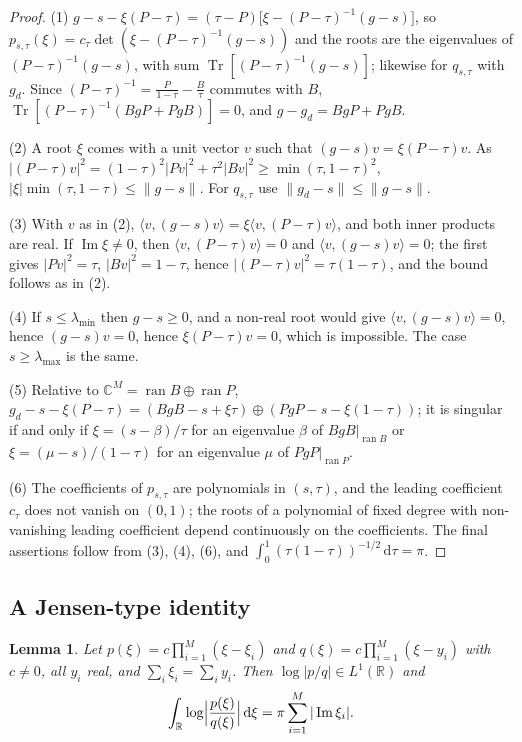 \documentclass[11pt]{amsart}
\newtheorem{lemma}[theorem]{Lemma}
\theoremstyle{definition}
\theoremstyle{remark}
\numberwithin{equation}{section}
\newcommand{\R}{\mathbb{R}}
\newcommand{\C}{\mathbb{C}}
\newcommand{\Tr}{\operatorname{Tr}}
\renewcommand{\Im}{\operatorname{Im}}
\newcommand{\ip}[2]{\langle #1,#2\rangle}
\newcommand{\lmin}{\lambda_{\min}}
\newcommand{\lmax}{\lambda_{\max}}
\newcommand{\dd}{\,\mathrm{d}}
\begin{document}
\begin{proof}
(1) $g-s-\xi(P-\tau)=(\tau-P)\bigl[\xi-(P-\tau)^{-1}(g-s)\bigr]$, so $p_{s,\tau}(\xi)=c_\tau\det(\xi-(P-\tau)^{-1}(g-s))$ and the
roots are the eigenvalues of $(P-\tau)^{-1}(g-s)$, with sum $\Tr[(P-\tau)^{-1}(g-s)]$; likewise for $q_{s,\tau}$ with $g_d$.
Since $(P-\tau)^{-1}=\frac P{1-\tau}-\frac B\tau$ commutes with $B$, $\Tr[(P-\tau)^{-1}(BgP+PgB)]=0$, and
$g-g_d=BgP+PgB$.

(2) A root $\xi$ comes with a unit vector $v$ such that $(g-s)v=\xi(P-\tau)v$. As
$|(P-\tau)v|^2=(1-\tau)^2|Pv|^2+\tau^2|Bv|^2\ge\min(\tau,1-\tau)^2$, $|\xi|\min(\tau,1-\tau)\le\|g-s\|$. For $q_{s,\tau}$ use
$\|g_d-s\|\le\|g-s\|$.

(3) With $v$ as in (2), $\ip v{(g-s)v}=\xi\ip v{(P-\tau)v}$, and both inner products are real. If $\Im\xi\ne0$, then
$\ip v{(P-\tau)v}=0$ and $\ip v{(g-s)v}=0$; the first gives $|Pv|^2=\tau$, $|Bv|^2=1-\tau$, hence
$|(P-\tau)v|^2=\tau(1-\tau)$, and the bound follows as in (2).

(4) If $s\le\lmin$ then $g-s\ge0$, and a non-real root would give $\ip v{(g-s)v}=0$, hence $(g-s)v=0$, hence
$\xi(P-\tau)v=0$, which is impossible. The case $s\ge\lmax$ is the same.

(5) Relative to $\C^M=\operatorname{ran}B\oplus\operatorname{ran}P$, $g_d-s-\xi(P-\tau)=(BgB-s+\xi\tau)\oplus(PgP-s-\xi(1-\tau))$; it is
singular if and only if $\xi=(s-\beta)/\tau$ for an eigenvalue $\beta$ of $BgB|_{\operatorname{ran}B}$ or
$\xi=(\mu-s)/(1-\tau)$ for an eigenvalue $\mu$ of $PgP|_{\operatorname{ran}P}$.

(6) The coefficients of $p_{s,\tau}$ are polynomials in $(s,\tau)$, and the leading coefficient $c_\tau$ does not vanish on
$(0,1)$; the roots of a polynomial of fixed degree with non-vanishing leading coefficient depend continuously on the
coefficients. The final assertions follow from (3), (4), (6), and $\int_0^1(\tau(1-\tau))^{-1/2}\dd\tau=\pi$.
\end{proof}

\subsection{A Jensen-type identity}

\begin{lemma}\label{lem:jensen}
Let $p(\xi)=c\prod_{i=1}^M(\xi-\xi_i)$ and $q(\xi)=c\prod_{i=1}^M(\xi-y_i)$ with $c\ne0$, all $y_i$ real, and
$\sum_i\xi_i=\sum_iy_i$. Then $\log|p/q|\in L^1(\R)$ and
\[
\int_\R\log\Bigl|\frac{p(\xi)}{q(\xi)}\Bigr|\dd\xi=\pi\sum_{i=1}^M|\Im\xi_i| .
\]
\end{lemma}
\end{document}
